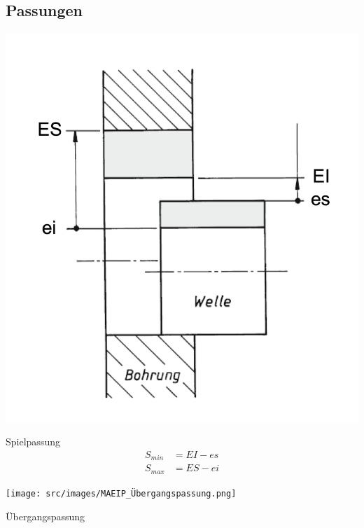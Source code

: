 \subsection{Passungen}
    \begin{minipage}{0.99\linewidth}
        \begin{minipage}{0.49\linewidth}
            \begin{center}
                \includegraphics[width = 0.6\linewidth]{src/images/MAEIP_Spielpassung.png}
            \end{center}
        \end{minipage}
        \begin{minipage}{0.49\linewidth}
            Spielpassung
            \begin{align*}
                S_{min} &= EI - es\\
                S_{max} &= ES - ei
            \end{align*}
        \end{minipage}
    \end{minipage}
    \begin{minipage}{0.99\linewidth}
        \begin{minipage}{0.49\linewidth}
            \begin{center}
                \texttt{[image: src/images/MAEIP\_Übergangspassung.png]}
            \end{center}
        \end{minipage}
        \begin{minipage}{0.49\linewidth}
            Übergangspassung
        \end{minipage}
    \end{minipage}
